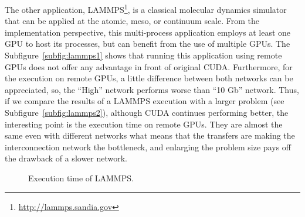 \documentclass[a4paper,twoside]{article}
\begin{document}
The other application, LAMMPS\footnote{\url{http://lammps.sandia.gov}}, is a classical molecular dynamics simulator that can be applied at the atomic, meso, or continuum scale. 
From the implementation perspective, this multi-process application employs at least one GPU to host its processes, but can benefit from the use of multiple GPUs.
The Subfigure~\ref{subfig:lammps1} shows that running this application using remote GPUs does not offer any advantage in front of original CUDA. 
Furthermore, for the execution on remote GPUs, a little difference between both networks can be appreciated, so, the ``High'' network performs worse than ``10 Gb'' network.
Thus, if we compare the results of a LAMMPS execution with a larger problem (see Subfigure~\ref{subfig:lammps2}), although CUDA continues performing better, the interesting point is the execution time on remote GPUs. 
They are almost the same even with different networks what means that the transfers are making the interconnection network the bottleneck, and enlarging the problem size
pays off the drawback of a slower network.

\begin{figure}[htb]
\centering
{}
\quad
{}
\caption{Execution time of LAMMPS.}
\label{fig:lammps}
\end{figure}
\end{document}

